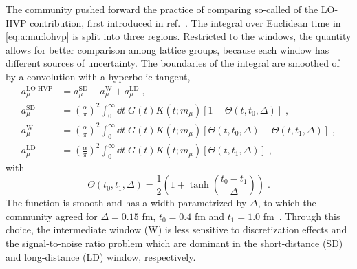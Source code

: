 The community pushed forward the practice of comparing so-called  of the LO-HVP contribution, first introduced in ref.~\cite{Lehner:2017kuc,RBC_2018}.
The integral over Euclidean time in \cref{eq:a:mu:lohvp} is split into three regions.
Restricted to the windows, the quantity allows for better comparison among lattice groups, because each window has different sources of uncertainty.
The boundaries of the integral are smoothed of by a convolution with a hyperbolic tangent,
\begin{align} \label{eq:a:mu:lohvp:windows}
a_{\mu}^{\text{LO-HVP}} &= a_{\mu}^{\text{SD}} + a_{\mu}^{\text{W}} + a_{\mu}^{\text{LD}} \;, \\
a_{\mu}^{\text{SD}} &=
\left( \frac{\alpha}{\pi} \right)^{2} \int_{0}^{\infty} \dd t \; G(t) K(t; m_{\mu}) \left[ 1 - \Theta(t, t_0, \Delta) \right] \;, \\
a_{\mu}^{\text{W}} &=
\left( \frac{\alpha}{\pi} \right)^{2} \int_{0}^{\infty} \dd t \; G(t) K(t; m_{\mu}) \left[ \Theta(t, t_0, \Delta) - \Theta(t, t_1, \Delta) \right] \;, \\
a_{\mu}^{\text{LD}} &=
\left( \frac{\alpha}{\pi} \right)^{2} \int_{0}^{\infty} \dd t \; G(t) K(t; m_{\mu}) \left[ \Theta(t, t_1, \Delta) \right] \;,
\end{align}
with
\begin{equation}
\Theta(t_0, t_1, \Delta) = \frac{1}{2} \left( 1 + \tanh\left( \frac{t_0 - t_1}{\Delta} \right) \right) \;.
\end{equation}
The function is smooth and has a width parametrized by $\Delta$, to which the community agreed for $\Delta = 0.15$ fm, $t_0 = 0.4$ fm and $t_1 = 1.0$ fm~\cite{RBC_2018}.
Through this choice, the intermediate window (W) is less sensitive to discretization effects and the signal-to-noise ratio problem which are dominant in the short-distance (SD) and long-distance (LD) window, respectively.


